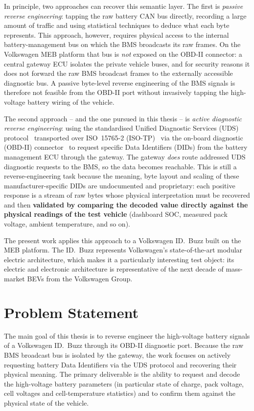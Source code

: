 \documentclass[11pt,a4paper,oneside,parskip=half]{scrreprt}
\begin{document}
In principle, two approaches can recover this semantic layer. The first is \textit{passive reverse engineering}: tapping the raw battery CAN bus directly, recording a large amount of traffic and using statistical techniques to deduce what each byte represents. This approach, however, requires physical access to the internal battery-management bus on which the BMS broadcasts its raw frames. On the Volkswagen MEB platform that bus is \emph{not} exposed on the OBD-II connector: a central gateway ECU isolates the private vehicle buses, and for security reasons it does not forward the raw BMS broadcast frames to the externally accessible diagnostic bus. A passive byte-level reverse engineering of the BMS signals is therefore not feasible from the OBD-II port without invasively tapping the high-voltage battery wiring of the vehicle.

The second approach -- and the one pursued in this thesis -- is \textit{active diagnostic reverse engineering}: using the standardised Unified Diagnostic Services (UDS) protocol~\cite{iso14229} transported over ISO~15765-2 (ISO-TP)~\cite{iso15765} via the on-board diagnostic (OBD-II) connector~\cite{saej1962} to request specific Data Identifiers (DIDs) from the battery management ECU through the gateway. The gateway \emph{does} route addressed UDS diagnostic requests to the BMS, so the data becomes reachable. This is still a reverse-engineering task because the meaning, byte layout and scaling of these manufacturer-specific DIDs are undocumented and proprietary: each positive response is a stream of raw bytes whose physical interpretation must be recovered and then \textbf{validated by comparing the decoded value directly against the physical readings of the test vehicle} (dashboard SOC, measured pack voltage, ambient temperature, and so on).

The present work applies this approach to a Volkswagen ID.~Buzz built on the MEB platform. The ID.~Buzz represents Volkswagen's state-of-the-art modular electric architecture, which makes it a particularly interesting test object: its electric and electronic architecture is representative of the next decade of mass-market BEVs from the Volkswagen Group.

\section{Problem Statement}
The main goal of this thesis is to reverse engineer the high-voltage battery signals of a Volkswagen ID.~Buzz through its OBD-II diagnostic port. Because the raw BMS broadcast bus is isolated by the gateway, the work focuses on actively requesting battery Data Identifiers via the UDS protocol and recovering their physical meaning. The primary deliverable is the ability to request and decode the high-voltage battery parameters (in particular state of charge, pack voltage, cell voltages and cell-temperature statistics) and to confirm them against the physical state of the vehicle.
\end{document}
